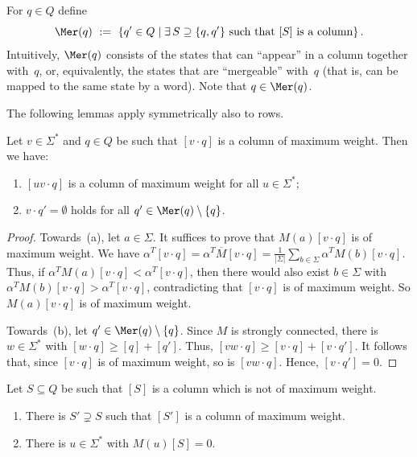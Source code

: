 For $q \in Q$ define
\[
 \Mer(q) \ := \ \{q' \in Q \mid \exists\,S \supseteq \{q,q'\} \text{ such that } [S] \text{ is a column}\}\,.
\]
Intuitively, $\Mer(q)$ consists of the states that can ``appear'' in a column together with~$q$, or, equivalently, the states that are ``mergeable'' with~$q$ (that is, can be mapped to the same state by a word).
Note that $q \in \Mer(q)$. 

The following lemmas apply symmetrically also to rows.

\begin{lem} \label{lem:max-column}
Let $v \in \Sigma^*$ and $q \in Q$ be such that $[v \cdot q]$ is a column of maximum weight. Then we have:
\begin{enumerate}
\item[(a)] $[u v \cdot q]$ is a column of maximum weight for all $u \in \Sigma^*$;
\item[(b)] $v \cdot q' = \emptyset$ holds for all $q' \in \Mer(q) \setminus \{q\}$.
\end{enumerate}
\end{lem}

\begin{proof}
Towards~(a), let $a \in \Sigma$.
It suffices to prove that $M(a) [v \cdot q]$ is of maximum weight.
We have $\alpha^T [v \cdot q] = \alpha^T \overline{M} [v \cdot q] = \frac{1}{|\Sigma|} \sum_{b \in \Sigma} \alpha^T M(b)[v \cdot q]$.
Thus, if $\alpha^T M(a) [v \cdot q] < \alpha^T [v \cdot q]$, then there would also exist $b \in \Sigma$ with $\alpha^T M(b) [v \cdot q] > \alpha^T [v \cdot q]$, contradicting that $[v \cdot q]$ is of maximum weight.
So $M(a)[v \cdot q]$ is of maximum weight.

Towards~(b), let $q' \in \Mer(q) \setminus \{q\}$.
Since $M$ is strongly connected, there is $w \in \Sigma^*$ with $[w \cdot q] \ge [q] + [q']$.
Thus, $[v w \cdot q] \ge [v \cdot q] + [v \cdot q']$.
It follows that, since $[v \cdot q]$ is of maximum weight, so is $[v w \cdot q]$.
Hence, $[v \cdot q'] = 0$.
\end{proof}

\begin{lem} \label{lem:non-max-column}
Let $S \subseteq Q$ be such that $[S]$ is a column which is not of maximum weight.
\begin{enumerate}
\item[(a)] There is $S' \supsetneq S$ such that $[S']$ is a column of maximum weight.
\item[(b)] There is $u \in \Sigma^*$ with $M(u) [S] = 0$.
\end{enumerate}
\end{lem}


